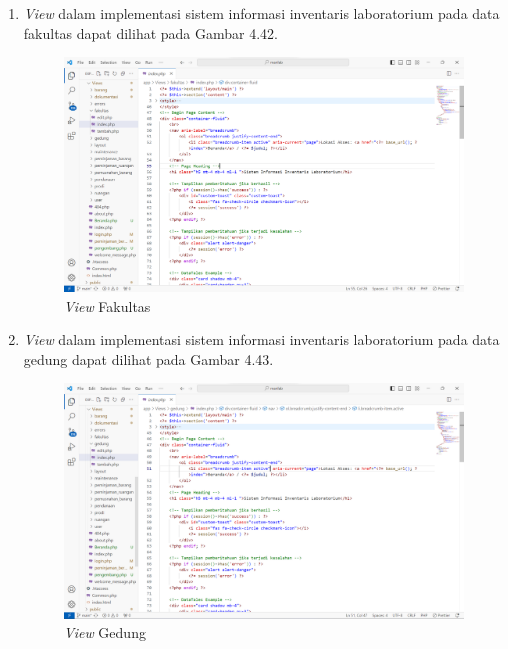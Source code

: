 \begin{enumerate}
  \item \textit{View} dalam implementasi sistem informasi inventaris laboratorium pada data fakultas dapat dilihat pada Gambar 4.42.
        \begin{figure}
          \centering
          \includegraphics[width=0.82\linewidth]{konten//gambar/view fakultas.png}
          \caption{\textit{View} Fakultas}
          \label{fig:enter-label}
        \end{figure}

  \item \textit{View} dalam implementasi sistem informasi inventaris laboratorium pada data gedung dapat dilihat pada Gambar 4.43.
        \begin{figure}
          \centering
          \includegraphics[width=0.82\linewidth]{konten//gambar/view gedung.png}
          \caption{\textit{View} Gedung}
          \label{fig:enter-label}
        \end{figure}


\end{enumerate}
